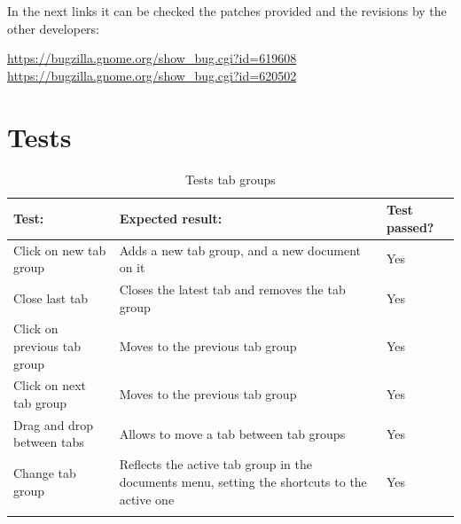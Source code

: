 In the next links it can be checked the patches provided and the revisions by the other developers:

\noindent\url{https://bugzilla.gnome.org/show_bug.cgi?id=619608} \\
\noindent\url{https://bugzilla.gnome.org/show_bug.cgi?id=620502}

\newpage
\section{Tests}

\begin{table}[H]
  \begin{center}
    \begin{tabularx}{\textwidth}{|X|X|l|}
      \firsthline
      \textbf{Test:} & \textbf{Expected result:} & \textbf{Test passed?} \\
      \hline
      Click on new tab group & Adds a new tab group, and a new document on it & Yes \\
      \hline
      Close last tab & Closes the latest tab and removes the tab group & Yes \\
      \hline
      Click on previous tab group & Moves to the previous tab group & Yes \\
      \hline
      Click on next tab group & Moves to the previous tab group & Yes \\
      \hline
      Drag and drop between tabs & Allows to move a tab between tab groups & Yes \\
      \hline
      Change tab group & Reflects the active tab group in the documents menu, setting the shortcuts to the active one & Yes \\
      \lasthline
    \end{tabularx}
    \caption{Tests tab groups}
  \end{center}
\end{table}
